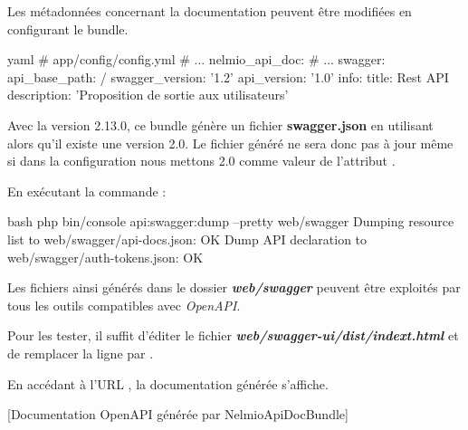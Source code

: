 \documentclass[big]{zmdocument}
\begin{document}
Les métadonnées concernant la documentation peuvent être modifiées en configurant le bundle.



\begin{CodeBlock}{yaml}
# app/config/config.yml
# ...
nelmio_api_doc:
    # ...
    swagger:
        api_base_path:        /
        swagger_version:      '1.2'
        api_version:          '1.0'
        info:
            title:                Rest API
            description:          'Proposition de sortie aux utilisateurs'
\end{CodeBlock}



\begin{Warning}
Avec la version 2.13.0, ce bundle génère un fichier \textbf{swagger.json} en utilisant  alors qu'il existe une version 2.0. Le fichier généré ne sera donc pas à jour même si dans la configuration nous mettons 2.0 comme valeur de l'attribut .
\end{Warning}


En exécutant la commande :



\begin{CodeBlock}{bash}
php bin/console api:swagger:dump --pretty web/swagger
Dumping resource list to web/swagger/api-docs.json:  OK
Dump API declaration to web/swagger/auth-tokens.json:  OK
\end{CodeBlock}



Les fichiers ainsi générés dans le dossier \textbf{\textit{web/swagger}} peuvent être exploités par tous les outils compatibles avec \textit{OpenAPI}.



Pour les tester, il suffit d'éditer le fichier \textbf{\textit{web/swagger-ui/dist/indext.html}}  et de remplacer la ligne  par .



En accédant à l'URL , la documentation générée s'affiche.



[Documentation OpenAPI générée par NelmioApiDocBundle]
\end{document}

